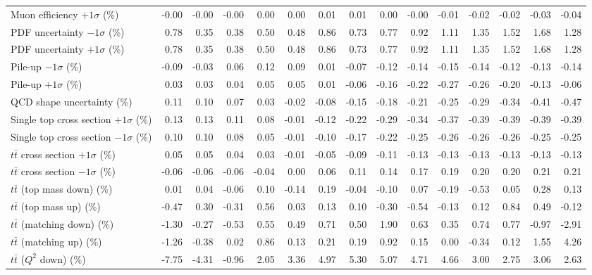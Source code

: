 \begin{table}[htbp]
{\begin{tabular}{lrrrrrrrrrrrrrr}
Muon efficiency $+1\sigma$ (\%) & -0.00 & -0.00 & -0.00 & 0.00 & 0.00 & 0.01 & 0.01 & 0.00 & -0.00 & -0.01 & -0.02 & -0.02 & -0.03 & -0.04 \\ 
PDF uncertainty $-1\sigma$ (\%) & 0.78 & 0.35 & 0.38 & 0.50 & 0.48 & 0.86 & 0.73 & 0.77 & 0.92 & 1.11 & 1.35 & 1.52 & 1.68 & 1.28 \\ 
PDF uncertainty $+1\sigma$ (\%) & 0.78 & 0.35 & 0.38 & 0.50 & 0.48 & 0.86 & 0.73 & 0.77 & 0.92 & 1.11 & 1.35 & 1.52 & 1.68 & 1.28 \\ 
Pile-up $-1\sigma$ (\%) & -0.09 & -0.03 & 0.06 & 0.12 & 0.09 & 0.01 & -0.07 & -0.12 & -0.14 & -0.15 & -0.14 & -0.12 & -0.13 & -0.14 \\ 
Pile-up $+1\sigma$ (\%) & 0.03 & 0.03 & 0.04 & 0.05 & 0.05 & 0.01 & -0.06 & -0.16 & -0.22 & -0.27 & -0.26 & -0.20 & -0.13 & -0.06 \\ 
QCD shape uncertainty (\%) & 0.11 & 0.10 & 0.07 & 0.03 & -0.02 & -0.08 & -0.15 & -0.18 & -0.21 & -0.25 & -0.29 & -0.34 & -0.41 & -0.47 \\ 
Single top cross section $+1\sigma$ (\%) & 0.13 & 0.13 & 0.11 & 0.08 & -0.01 & -0.12 & -0.22 & -0.29 & -0.34 & -0.37 & -0.39 & -0.39 & -0.39 & -0.39 \\ 
Single top cross section $-1\sigma$ (\%) & 0.10 & 0.10 & 0.08 & 0.05 & -0.01 & -0.10 & -0.17 & -0.22 & -0.25 & -0.26 & -0.26 & -0.26 & -0.25 & -0.25 \\ 
$t\bar{t}$ cross section $+1\sigma$ (\%) & 0.05 & 0.05 & 0.04 & 0.03 & -0.01 & -0.05 & -0.09 & -0.11 & -0.13 & -0.13 & -0.13 & -0.13 & -0.13 & -0.13 \\ 
$t\bar{t}$ cross section $-1\sigma$ (\%) & -0.06 & -0.06 & -0.06 & -0.04 & 0.00 & 0.06 & 0.11 & 0.14 & 0.17 & 0.19 & 0.20 & 0.20 & 0.21 & 0.21 \\ 
$t\bar{t}$ (top mass down) (\%) & 0.01 & 0.04 & -0.06 & 0.10 & -0.14 & 0.19 & -0.04 & -0.10 & 0.07 & -0.19 & -0.53 & 0.05 & 0.28 & 0.13 \\ 
$t\bar{t}$ (top mass up) (\%) & -0.47 & 0.30 & -0.31 & 0.56 & 0.03 & 0.13 & 0.10 & -0.30 & -0.54 & -0.13 & 0.12 & 0.84 & 0.49 & -0.12 \\ 
$t\bar{t}$ (matching down) (\%) & -1.30 & -0.27 & -0.53 & 0.55 & 0.49 & 0.71 & 0.50 & 1.90 & 0.63 & 0.35 & 0.74 & 0.77 & -0.97 & -2.91 \\ 
$t\bar{t}$ (matching up) (\%) & -1.26 & -0.38 & 0.02 & 0.86 & 0.13 & 0.21 & 0.19 & 0.92 & 0.15 & 0.00 & -0.34 & 0.12 & 1.55 & 4.26 \\ 
$t\bar{t}$ ($Q^{2}$ down) (\%) & -7.75 & -4.31 & -0.96 & 2.05 & 3.36 & 4.97 & 5.30 & 5.07 & 4.71 & 4.66 & 3.00 & 2.75 & 3.06 & 2.63 \\ 

\end{tabular}}
\end{table}
